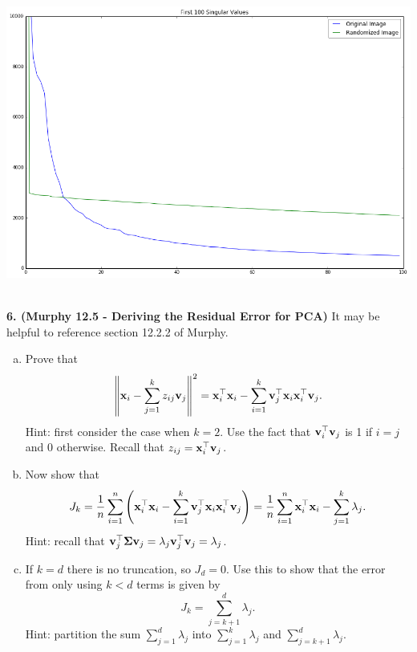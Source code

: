 \documentclass[12pt,letterpaper,fleqn]{hmcpset}
\begin{document}
\includegraphics[scale = .5]{p5rand.png}\\\\


\newpage


\textbf{6. (Murphy 12.5 - Deriving the Residual Error for PCA)} It may be helpful to reference
section 12.2.2 of Murphy.
\begin{enumerate}[(a)]
    \item Prove that
        \[
            \left\|{\bf x}_i - \sum_{j=1}^k z_{ij}{\bf v}_j\right\|^2 = {\bf x}_i^\top{\bf x}_i - \sum_{i=1}^k{\bf v}_j^\top {\bf x}_i{\bf x}_i^\top {\bf v}_j.
        \]
        Hint: first consider the case when $k=2$. Use the fact that ${\bf v}_i^\top{\bf v}_j$ is 1 if $i=j$ and 0 otherwise.
        Recall that $z_{ij} = {\bf x}_i^\top{\bf v}_j$.

    \item Now show that
        \[
            J_k = \frac{1}{n}\sum_{i=1}^n \left({\bf x}_i^\top {\bf x}_i - \sum_{i=1}^k{\bf v}_j^\top {\bf x}_i{\bf x}_i^\top {\bf v}_j\right) = \frac{1}{n}\sum_{i=1}^n {\bf x}_i^\top{\bf x}_i - \sum_{j=1}^k\lambda_j.
        \]
        Hint: recall that ${\bf v}_j^\top \hbox{\boldmath$\Sigma$} {\bf v}_j = \lambda_j{\bf v}_j^\top{\bf v}_j = \lambda_j$.

    \item If $k=d$ there is no truncation, so $J_d=0$. Use this to show that the error from only using $k<d$
        terms is given by
        \[
            J_k = \sum_{j=k+1}^d \lambda_j.
        \]
        Hint: partition the sum $\sum_{j=1}^d \lambda_j$ into $\sum_{j=1}^k \lambda_j$ and $\sum_{j=k+1}^d \lambda_j$.
\end{enumerate}
\end{document}
